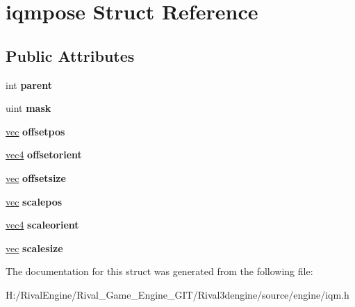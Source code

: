 \hypertarget{structiqmpose}{}\section{iqmpose Struct Reference}
\label{structiqmpose}
\subsection*{Public Attributes}
\begin{DoxyCompactItemize}
\item 
\mbox{\label{structiqmpose_a0617283a7247ea6cf62ed179fec87247}} 
int {\bfseries parent}
\item 
\mbox{\label{structiqmpose_a7002e5051e2a217660fb64839cf5c43f}} 
uint {\bfseries mask}
\item 
\mbox{\label{structiqmpose_a8a5439f20dc3ab03f569b8ab7dfdc79b}} 
\hyperlink{structvec}{vec} {\bfseries offsetpos}
\item 
\mbox{\label{structiqmpose_a1a46d15f089e171c8df8508221798f08}} 
\hyperlink{structvec4}{vec4} {\bfseries offsetorient}
\item 
\mbox{\label{structiqmpose_aa5bbe93773a841e7b9c47f811b93e5e2}} 
\hyperlink{structvec}{vec} {\bfseries offsetsize}
\item 
\mbox{\label{structiqmpose_a1ce4d9e89f4cf28568c68b0f81f7d082}} 
\hyperlink{structvec}{vec} {\bfseries scalepos}
\item 
\mbox{\label{structiqmpose_a5dd2ed17e84568319e6de597e8e0e16d}} 
\hyperlink{structvec4}{vec4} {\bfseries scaleorient}
\item 
\mbox{\label{structiqmpose_aa76e8f34cb2ade3178b3c7b79a97ae8b}} 
\hyperlink{structvec}{vec} {\bfseries scalesize}
\end{DoxyCompactItemize}


The documentation for this struct was generated from the following file\+:\begin{DoxyCompactItemize}
\item 
H\+:/\+Rival\+Engine/\+Rival\+\_\+\+Game\+\_\+\+Engine\+\_\+\+G\+I\+T/\+Rival3dengine/source/engine/iqm.\+h\end{DoxyCompactItemize}
